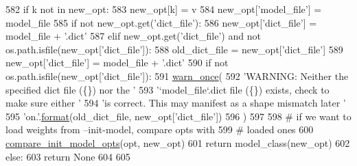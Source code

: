 \begin{DoxyCode}
582             \textcolor{keywordflow}{if} k \textcolor{keywordflow}{not} \textcolor{keywordflow}{in} new\_opt:
583                 new\_opt[k] = v
584         new\_opt[\textcolor{stringliteral}{'model\_file'}] = model\_file
585         \textcolor{keywordflow}{if} \textcolor{keywordflow}{not} new\_opt.get(\textcolor{stringliteral}{'dict\_file'}):
586             new\_opt[\textcolor{stringliteral}{'dict\_file'}] = model\_file + \textcolor{stringliteral}{'.dict'}
587         \textcolor{keywordflow}{elif} new\_opt.get(\textcolor{stringliteral}{'dict\_file'}) \textcolor{keywordflow}{and} \textcolor{keywordflow}{not} os.path.isfile(new\_opt[\textcolor{stringliteral}{'dict\_file'}]):
588             old\_dict\_file = new\_opt[\textcolor{stringliteral}{'dict\_file'}]
589             new\_opt[\textcolor{stringliteral}{'dict\_file'}] = model\_file + \textcolor{stringliteral}{'.dict'}
590         \textcolor{keywordflow}{if} \textcolor{keywordflow}{not} os.path.isfile(new\_opt[\textcolor{stringliteral}{'dict\_file'}]):
591             \hyperlink{namespaceparlai_1_1utils_1_1misc_acf146e70ea7f6867969a7c2b545d4b4b}{warn\_once}(
592                 \textcolor{stringliteral}{'WARNING: Neither the specified dict file (\{\}) nor the '}
593                 \textcolor{stringliteral}{'`model\_file`.dict file (\{\}) exists, check to make sure either '}
594                 \textcolor{stringliteral}{'is correct. This may manifest as a shape mismatch later '}
595                 \textcolor{stringliteral}{'on.'}.\hyperlink{namespaceparlai_1_1chat__service_1_1services_1_1messenger_1_1shared__utils_a32e2e2022b824fbaf80c747160b52a76}{format}(old\_dict\_file, new\_opt[\textcolor{stringliteral}{'dict\_file'}])
596             )
597 
598         \textcolor{comment}{# if we want to load weights from --init-model, compare opts with}
599         \textcolor{comment}{# loaded ones}
600         \hyperlink{namespaceparlai_1_1core_1_1agents_a7eb0ec391b94a2adc51acdf8d2a35a68}{compare\_init\_model\_opts}(opt, new\_opt)
601         \textcolor{keywordflow}{return} model\_class(new\_opt)
602     \textcolor{keywordflow}{else}:
603         \textcolor{keywordflow}{return} \textcolor{keywordtype}{None}
604 
605 
\end{DoxyCode}
\mbox{\label{namespaceparlai_1_1core_1_1agents_a7a5f5076b35ce376d8b46bfb362bfc53}} 
